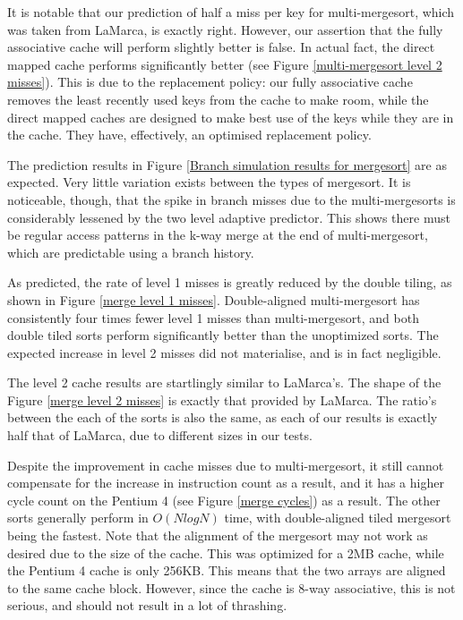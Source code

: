 \label{mergesort replacement policy}
It is notable that our prediction of half a miss per key for multi-mergesort,
which was taken from LaMarca, is exactly right. However, our assertion that the
fully associative cache will perform slightly better is false. In actual fact,
the direct mapped cache performs significantly better (see Figure
\vref{multi-mergesort level 2 misses}). This is due to the replacement policy:
our fully associative cache removes the least recently used keys from the cache
to make room, while the direct mapped caches are designed to make best use of
the keys while they are in the cache. They have, effectively, an optimised
replacement policy.

The prediction results in Figure \ref{Branch simulation results for mergesort}
are as expected. Very little variation exists between the types of mergesort. It
is noticeable, though, that the spike in branch misses due to the
multi-mergesorts is considerably lessened by the two level adaptive predictor.
This shows there must be regular access patterns in the k-way merge at the end
of multi-mergesort, which are predictable using a branch history.

As predicted, the rate of level 1 misses is greatly reduced by the double
tiling, as shown in Figure \ref{merge level 1 misses}. Double-aligned multi-mergesort
has consistently four times fewer level 1 misses than multi-mergesort, and both
double tiled sorts perform significantly better than the unoptimized sorts. The
expected increase in level 2 misses did not materialise, and is in fact
negligible.

The level 2 cache results are startlingly similar to LaMarca's. The shape of the
Figure \ref{merge level 2 misses} is exactly that provided by LaMarca. The
ratio's between the each of the sorts is also the same, as each of our results
is exactly half that of LaMarca, due to different  sizes in our tests.

Despite the improvement in cache misses due to multi-mergesort, it still cannot
compensate for the increase in instruction count as a result, and it has a higher
cycle count on the Pentium 4 (see Figure \ref{merge cycles}) as a result. The
other sorts generally perform in $O(NlogN)$ time, with double-aligned tiled mergesort
being the fastest. Note that the alignment of the mergesort may not work as
desired due to the size of the cache. This was optimized for a 2MB cache, while
the Pentium 4 cache is only 256KB. This means that the two arrays are aligned to
the same cache block. However, since the cache is 8-way associative, this is not
serious, and should not result in a lot of thrashing.

